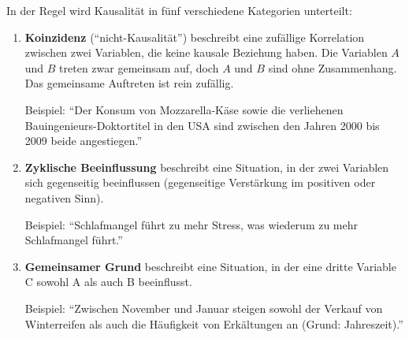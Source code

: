 \begin{mydefinition}[Kausalität]
In der Regel wird Kausalität in fünf verschiedene Kategorien unterteilt:
\begin{enumerate}
	\item \textbf{Koinzidenz} (\enquote{nicht-Kausalität}) beschreibt eine zufällige Korrelation zwischen zwei Variablen, die keine kausale Beziehung haben. Die Variablen $A$ und $B$ treten zwar gemeinsam auf, doch $A$ und $B$ sind ohne Zusammenhang. Das gemeinsame Auftreten ist rein zufällig.
	      \begin{center}
	      \end{center}
	      Beispiel: \enquote{Der Konsum von Mozzarella-Käse sowie die verliehenen Bauingenieurs-Doktortitel in den USA sind zwischen den Jahren 2000 bis 2009 beide angestiegen.}
	\item \textbf{Zyklische Beeinflussung} beschreibt eine Situation, in der zwei Variablen sich gegenseitig beeinflussen (gegenseitige Verstärkung im positiven oder negativen Sinn).
	      \begin{center}
	      \end{center}
	      Beispiel: \enquote{Schlafmangel führt zu mehr Stress, was wiederum zu mehr Schlafmangel führt.}
	\item \textbf{Gemeinsamer Grund} beschreibt eine Situation, in der eine dritte Variable C sowohl A als auch B beeinflusst.
	      \begin{center}
	      \end{center}
	      Beispiel: \enquote{Zwischen November und Januar steigen sowohl der Verkauf von Winterreifen als auch die Häufigkeit von Erkältungen an (Grund: Jahreszeit).}


\end{enumerate}
\end{mydefinition}
